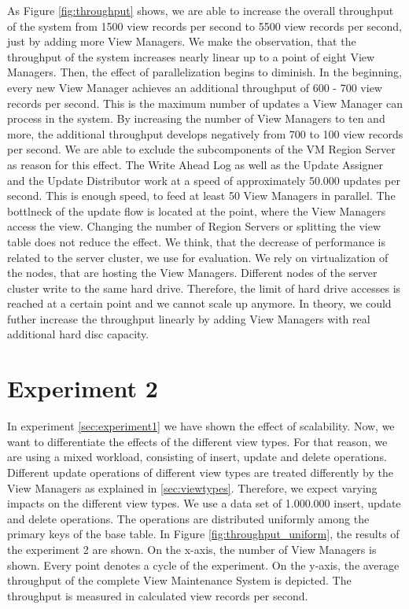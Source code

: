 \documentclass[11pt,a4paper,bibtotoc,idxtotoc,headsepline,footsepline,footexclude,BCOR12mm,DIV13]{scrbook}
\begin{document}
As Figure \ref{fig:throughput} shows, we are able to increase the overall throughput of the system from 1500 view records per second to 5500 view records per second, just by adding more View Managers. We make the observation, that the throughput of the system increases nearly linear up to a point of eight View Managers. Then, the effect of parallelization begins to diminish. In the beginning, every new View Manager achieves an additional throughput of 600 - 700 view records per second. This is the maximum number of updates a View Manager can process in the system. By increasing the number of View Managers to ten and more, the additional throughput develops negatively from 700 to 100 view records per second. We are able to exclude the subcomponents of the VM Region Server as reason for this effect. The Write Ahead Log as well as the Update Assigner and the Update Distributor work at a speed of approximately 50.000 updates per second. This is enough speed, to feed at least 50 View Managers in parallel. The bottlneck of the update flow is located at the point, where the View Managers access the view. Changing the number of Region Servers or splitting the view table does not reduce the effect. We think, that the decrease of performance is related to the server cluster, we use for evaluation. We rely on virtualization of the nodes, that are hosting the View Managers. Different nodes of the server cluster write to the same hard drive. Therefore, the limit of hard drive accesses is reached at a certain point and we cannot scale up anymore. In theory, we could futher increase the throughput linearly by adding View Managers with real additional hard disc capacity.



\section{Experiment 2}
\label{sec:experiment2}

In experiment \ref{sec:experiment1} we have shown the effect of scalability. Now, we want to differentiate the effects of the different view types. For that reason, we are using a mixed workload, consisting of insert, update and delete operations. Different update operations of different view types are treated differently by the View Managers as explained in \ref{sec:viewtypes}. Therefore, we expect varying impacts on the different view types. We use a data set of 1.000.000 insert, update and delete operations. The operations are distributed uniformly among the primary keys of the base table. In Figure \ref{fig:throughput_uniform}, the results of the experiment 2 are shown. On the x-axis, the number of View Managers is shown. Every point denotes a cycle of the experiment. On the y-axis, the average throughput of the complete View Maintenance System is depicted. The throughput is measured in calculated view records per second.
\end{document}
